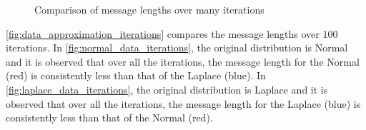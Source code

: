 \documentclass[wcp]{jmlr}
\begin{document}
\begin{figure}[!htb]
  \centering
    \hspace{0.5cm}
    \caption{Comparison of message lengths over many iterations}
    \label{fig:data_approximation_iterations}
\end{figure}

\autoref{fig:data_approximation_iterations} compares the message lengths over 100 iterations.
In \autoref{fig:normal_data_iterations}, the original distribution is Normal and it is observed
that over all the iterations, the message length for the Normal (red) is consistently less than that
of the Laplace (blue). In \autoref{fig:laplace_data_iterations}, the original distribution is 
Laplace and it is observed that over all the iterations, the message length for the Laplace (blue) 
is consistently less than that of the Normal (red).
\end{document}
